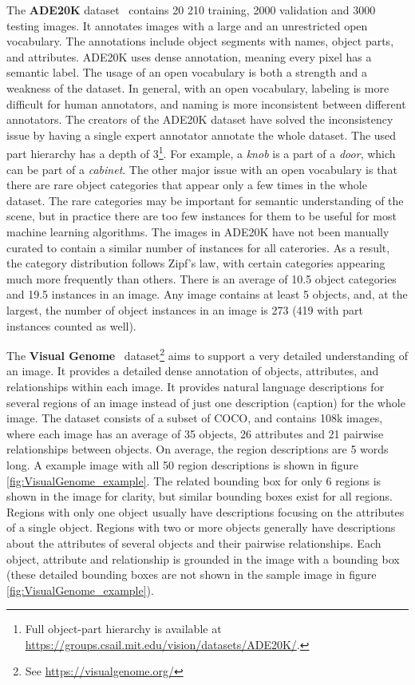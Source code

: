 \documentclass[english,twoside,openright]{HYgraduMLDS}
\begin{document}
The \textbf{ADE20K} dataset~\cite{zhou2017scene} contains 20 210 training, 2000 validation and 3000 testing images. It annotates images with a large and an unrestricted open vocabulary. The annotations include object segments with names, object parts, and attributes. ADE20K uses dense annotation, meaning every pixel has a semantic label. The usage of an open vocabulary is both a strength and a weakness of the dataset. In general, with an open vocabulary, labeling is more difficult for human annotators, and naming is more inconsistent between different annotators. The creators of the ADE20K dataset have solved the inconsistency issue by having a single expert annotator annotate the whole dataset. The used part hierarchy has a depth of 3\footnote{Full object-part hierarchy is available at \url{https://groups.csail.mit.edu/vision/datasets/ADE20K/}.}. For example, a \textit{knob} is a part of a \textit{door}, which can be part of a \textit{cabinet}. The other major issue with an open vocabulary is that there are rare object categories that appear only a few times in the whole dataset. The rare categories may be important for semantic understanding of the scene, but in practice there are too few instances for them to be useful for most machine learning algorithms. The images in ADE20K have not been manually curated to contain a similar number of instances for all caterories. As a result, the category distribution follows Zipf's law, with certain categories appearing much more frequently than others. There is an average of 10.5 object categories and 19.5 instances in an image. Any image contains at least 5 objects, and, at the largest, the number of object instances in an image is 273 (419 with part instances counted as well).

The \textbf{Visual Genome}~\cite{VisualGenome} dataset\footnote{See \url{https://visualgenome.org/}} aims to support a very detailed understanding of an image. It provides a detailed dense annotation of objects, attributes, and relationships within each image. It provides natural language descriptions for several regions of an image instead of just one description (caption) for the whole image. The dataset consists of a subset of COCO, and contains 108k images, where each image has an average of 35 objects, 26 attributes and 21 pairwise relationships between objects. On average, the region descriptions are 5 words long. A example image with all 50 region descriptions is shown in figure \ref{fig:VisualGenome_example}. The related bounding box for only 6 regions is shown in the image for clarity, but similar bounding boxes exist for all regions. Regions with only one object usually have descriptions focusing on the attributes of a single object. Regions with
two or more objects generally have descriptions about the attributes of several objects and their pairwise relationships. Each object, attribute and relationship is grounded in the image with a bounding box (these detailed bounding boxes are not shown in the sample image in figure \ref{fig:VisualGenome_example}).
\end{document}

